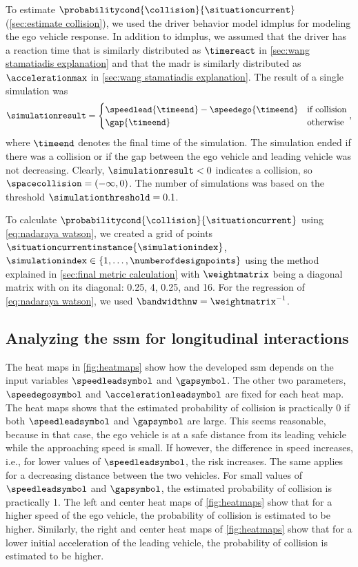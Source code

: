 To estimate $\probabilitycond{\collision}{\situationcurrent}$ (\cref{sec:estimate collision}), we used the driver behavior model \ac{idmplus} \autocite{schakel2010effects} for modeling the ego vehicle response.
In addition to \ac{idmplus}, we assumed that the driver has a reaction time that is similarly distributed as $\timereact$ in \cref{sec:wang stamatiadis explanation} and that the \ac{madr} is similarly distributed as $\accelerationmax$ in \cref{sec:wang stamatiadis explanation}.
The result of a single simulation was
\begin{equation}
	\simulationresult = \begin{cases}
		\speedlead{\timeend} - \speedego{\timeend} & \text{if collision} \\
		\gap{\timeend} & \text{otherwise}
	\end{cases},
\end{equation}
where $\timeend$ denotes the final time of the simulation.
The simulation ended if there was a collision or if the gap between the ego vehicle and leading vehicle was not decreasing.
Clearly, $\simulationresult<0$ indicates a collision, so $\spacecollision=(-\infty, 0)$.
The number of simulations was based on the threshold $\simulationthreshold=0.1$.

To calculate $\probabilitycond{\collision}{\situationcurrent}$ using \cref{eq:nadaraya watson}, we created a grid of points $\situationcurrentinstance{\simulationindex}$, $\simulationindex\in\{1,\ldots,\numberofdesignpoints\}$ using the method explained in \cref{sec:final metric calculation} with $\weightmatrix$ being a diagonal matrix with on its diagonal: 0.25, 4, 0.25, and 16.
For the regression of \cref{eq:nadaraya watson}, we used $\bandwidthnw=\weightmatrix^{-1}$.



\subsection{Analyzing the \acs{ssm} for longitudinal interactions}
\label{sec:analyzing ngsim metric}

The heat maps in \cref{fig:heatmaps} show how the developed \ac{ssm} depends on the input variables $\speedleadsymbol$ and $\gapsymbol$. 
The other two parameters, $\speedegosymbol$ and $\accelerationleadsymbol$ are fixed for each heat map.
The heat maps shows that the estimated probability of collision is practically 0 if both $\speedleadsymbol$ and $\gapsymbol$ are large.
This seems reasonable, because in that case, the ego vehicle is at a safe distance from its leading vehicle while the approaching speed is small. 
If however, the difference in speed increases, i.e., for lower values of $\speedleadsymbol$, the risk increases. 
The same applies for a decreasing distance between the two vehicles.
For small values of $\speedleadsymbol$ and $\gapsymbol$, the estimated probability of collision is practically 1.
The left and center heat maps of \cref{fig:heatmaps} show that for a higher speed of the ego vehicle, the probability of collision is estimated to be higher.
Similarly, the right and center heat maps of \cref{fig:heatmaps} show that for a lower initial acceleration of the leading vehicle, the probability of collision is estimated to be higher.

